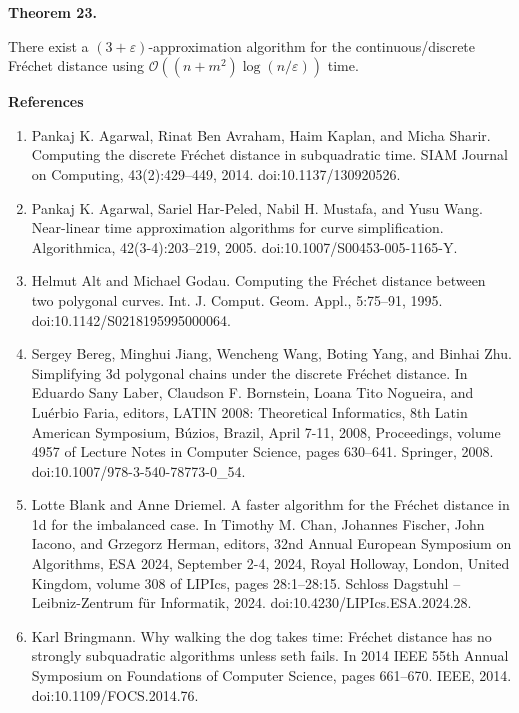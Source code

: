 \documentclass[10pt,a4paper]{article}
\begin{document}
\par
\par
\par\medskip\noindent\textbf{Theorem 23.}\par
There exist a $(3+\varepsilon)$-approximation algorithm for the continuous/discrete Fréchet distance using $\mathcal{O}((n+m^{2})\log(n/\varepsilon))$ time.
\par
\par
\par
\par\medskip\noindent\textbf{References}\par
\begin{enumerate}
\item[]  [1]  Pankaj K. Agarwal, Rinat Ben Avraham, Haim Kaplan, and Micha Sharir.  Computing the discrete Fréchet distance in subquadratic time.  SIAM Journal on Computing, 43(2):429–449, 2014.  doi:10.1137/130920526.  
\item[]  [2]  Pankaj K. Agarwal, Sariel Har-Peled, Nabil H. Mustafa, and Yusu Wang.  Near-linear time approximation algorithms for curve simplification.  Algorithmica, 42(3-4):203–219, 2005.  doi:10.1007/S00453-005-1165-Y.  
\item[]  [3]  Helmut Alt and Michael Godau.  Computing the Fréchet distance between two polygonal curves.  Int. J. Comput. Geom. Appl., 5:75–91, 1995.  doi:10.1142/S0218195995000064.  
\item[]  [4]  Sergey Bereg, Minghui Jiang, Wencheng Wang, Boting Yang, and Binhai Zhu.  Simplifying 3d polygonal chains under the discrete Fréchet distance.  In Eduardo Sany Laber, Claudson F. Bornstein, Loana Tito Nogueira, and Luérbio Faria, editors, LATIN 2008: Theoretical Informatics, 8th Latin American Symposium, Búzios, Brazil, April 7-11, 2008, Proceedings, volume 4957 of Lecture Notes in Computer Science, pages 630–641. Springer, 2008.  doi:10.1007/978-3-540-78773-0\_54.  
\item[]  [5]  Lotte Blank and Anne Driemel.  A faster algorithm for the Fréchet distance in 1d for the imbalanced case.  In Timothy M. Chan, Johannes Fischer, John Iacono, and Grzegorz Herman, editors, 32nd Annual European Symposium on Algorithms, ESA 2024, September 2-4, 2024, Royal Holloway, London, United Kingdom, volume 308 of LIPIcs, pages 28:1–28:15. Schloss Dagstuhl – Leibniz-Zentrum für Informatik, 2024.  doi:10.4230/LIPIcs.ESA.2024.28.  
\item[]  [6]  Karl Bringmann.  Why walking the dog takes time: Fréchet distance has no strongly subquadratic algorithms unless seth fails.  In 2014 IEEE 55th Annual Symposium on Foundations of Computer Science, pages 661–670. IEEE, 2014.  doi:10.1109/FOCS.2014.76.  

\end{enumerate}
\end{document}
